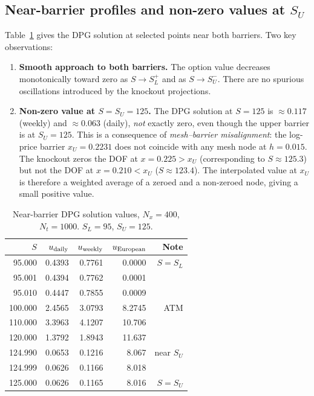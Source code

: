 \documentclass[11pt,a4paper]{article}
\newcommand{\Nx}{N_x}
\newcommand{\Nt}{N_t}
\newcommand{\SL}{S_L}
\newcommand{\SU}{S_U}
\begin{document}
\subsection{Near-barrier profiles and non-zero values at $\SU$}

Table~\ref{tab:nearbarrier} gives the DPG solution at selected points
near both barriers.  Two key observations:

\begin{enumerate}[noitemsep]
  \item \textbf{Smooth approach to both barriers.}  The option value
        decreases monotonically toward zero as $S \to \SL^+$ and as
        $S \to \SU^-$.  There are no spurious oscillations introduced
        by the knockout projections.

  \item \textbf{Non-zero value at $S = \SU = 125$.}
        The DPG solution at $S = 125$ is $\approx 0.117$ (weekly) and
        $\approx 0.063$ (daily), \emph{not} exactly zero, even though
        the upper barrier is at $\SU = 125$.  This is a consequence of
        \emph{mesh--barrier misalignment}: the log-price barrier
        $x_U = 0.2231$ does not coincide with any mesh node at
        $h = 0.015$.  The knockout zeros the DOF at $x = 0.225 > x_U$
        (corresponding to $S \approx 125.3$) but not the DOF at
        $x = 0.210 < x_U$ ($S \approx 123.4$).  The interpolated value
        at $x_U$ is therefore a weighted average of a zeroed and a
        non-zeroed node, giving a small positive value.
\end{enumerate}

\begin{table}[htbp]
\centering
\caption{Near-barrier DPG solution values, $\Nx=400$, $\Nt=1000$.
         $S_L = 95$, $S_U = 125$.}
\label{tab:nearbarrier}
\small
\begin{tabular}{rrrrr}
\toprule
$S$ & $u_{\rm daily}$ & $u_{\rm weekly}$ & $u_{\rm European}$ & Note \\
\midrule
95.000  & 0.4393 & 0.7761 & 0.0000 & $S = \SL$ \\
95.001  & 0.4394 & 0.7762 & 0.0001 & \\
95.010  & 0.4447 & 0.7855 & 0.0009 & \\
100.000 & 2.4565 & 3.0793 & 8.2745 & ATM \\
110.000 & 3.3963 & 4.1207 & 10.706 & \\
120.000 & 1.3792 & 1.8943 & 11.637 & \\
124.990 & 0.0653 & 0.1216 &  8.067 & near $\SU$ \\
124.999 & 0.0626 & 0.1166 &  8.018 & \\
125.000 & 0.0626 & 0.1165 &  8.016 & $S = \SU$ \\
\bottomrule
\end{tabular}
\end{table}
\end{document}
